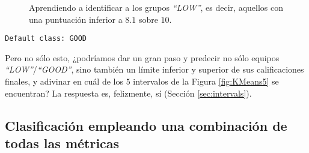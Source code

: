 \begin{figure}[H]
\centering
{}
\caption{Aprendiendo a identificar a los grupos \emph{``LOW''}, es decir, aquellos con una puntuación inferior a $8.1$ sobre $10$.}
\label{fig:cmbegin1}
\end{figure}

\begin{tcolorbox}[title=Reglas de clasificación para identificar grupos de tipo \emph{``LOW''}.]
  \makeatletter
  \makeatother

 \label{rulesbegin1}  

\begin{multicols}{2}
    \begin{verbatim}
Default class: GOOD
    \end{verbatim}
  \end{multicols}
\end{tcolorbox}

Pero no sólo esto, ¿podríamos dar un gran paso y predecir no sólo equipos \emph{``LOW''}/\emph{``GOOD''}, sino también un límite inferior y superior de sus calificaciones finales, y adivinar en cuál de los $5$ intervalos de la Figura \ref{fig:KMeans5} se encuentran? La respuesta es, felizmente, sí (Sección \ref{sec:intervals}).

\subsection{Clasificación empleando una combinación de todas las métricas}

